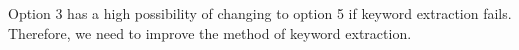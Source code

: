 \documentclass[journal]{IAENGtran}
\begin{document}
Option 3 has a high possibility of changing to option 5 if keyword extraction fails. Therefore, we need to improve the method of keyword extraction.

\end{document}
